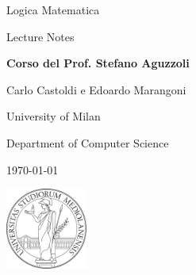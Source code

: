 \documentclass[12pt, a4paper,titlepage]{book}
\theoremstyle{plain}%
\theoremstyle{definition}
\begin{document}
\pagestyle{fancy}
\renewcommand{\headrulewidth}{0pt} %
\renewcommand{\footrulewidth}{0pt} %
\renewcommand{\chaptermark}[1]{\markboth{#1}{}}
\fancyhead[LE]{\thepage \ \ }
\fancyhead[RO]{\MakeUppercase\leftmark \ \ \thepage}
\fancyfoot[C] {\thepage}



\frontmatter
\begin{titlepage}
  \centering
              \vspace*{6cm}
              \Huge{Logica Matematica}
  
              \vspace*{0.5cm}

           \Large{Lecture Notes} 

              \vspace*{0.5cm}

              \Large{\textbf{Corso del Prof. Stefano Aguzzoli}}
        
              \vspace*{2cm}

         \Large{Carlo Castoldi e Edoardo Marangoni}

              \vspace*{2cm}

              \small{University of Milan}

              \small{Department of Computer Science}

              \small{\today}
              
              \vspace*{2cm}
\includegraphics[width=0.2\textwidth]{images/unimi.png} 

\end{titlepage}

\tableofcontents    


\mainmatter
\pagestyle{fancy}
\renewcommand{\headrulewidth}{0pt}
\renewcommand{\chaptermark}[1]{\markboth{#1}{}}
\fancyhf{}
\fancyhead[LE]{\thepage \ \ \MakeUppercase\leftmark}
\fancyhead[RE, LO]{\MakeUppercase\chaptertitlename \ \ \thechapter}
\fancyhead[RO]{\rightmark \ \ \thepage}
\fancyfoot[C]{\thepage}
\end{document}
